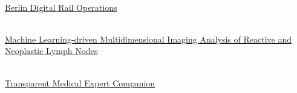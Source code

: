     {
        \\
        \href{https://www.hhi.fraunhofer.de/en/departments/ai/projects/berdiba.html}{Berlin Digital Rail Operations}
    }

    {
        \\
        \href{https://www.hhi.fraunhofer.de/en/departments/ai/projects/patho234.html}{
                     Machine Learning-driven Multidimensional Imaging Analysis
                    of Reactive  and Neoplastic Lymph Nodes}
    }

    {
        \\
        \href{https://www.hhi.fraunhofer.de/en/departments/ai/projects/trameexco.html}{Transparent Medical Expert Companion}
    }


\fi
